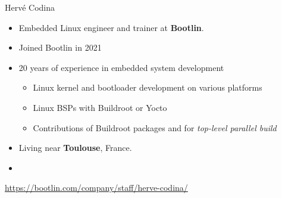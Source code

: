 \begin{frame}{Hervé Codina}
  \begin{itemize}
  \item Embedded Linux engineer and trainer at {\bf Bootlin}.
  \item Joined Bootlin in 2021
  \item 20 years of experience in embedded system development
    \begin{itemize}
    \item Linux kernel and bootloader development on various platforms
    \item Linux BSPs with Buildroot or Yocto
    \item Contributions of Buildroot packages and for {\em top-level
        parallel build}
    \end{itemize}
  \item Living near {\bf Toulouse}, France.
  \item {}
  \end{itemize}
  {\small \url{https://bootlin.com/company/staff/herve-codina/}}
\end{frame}
